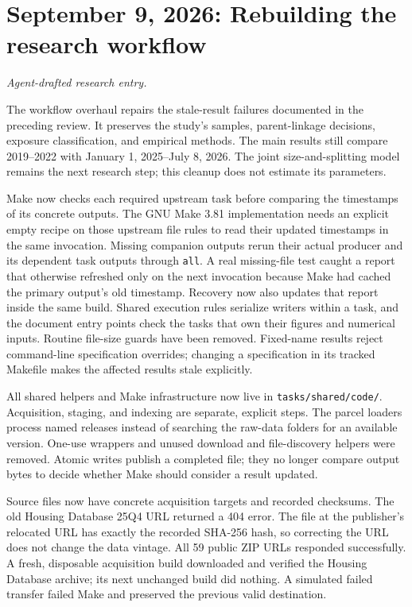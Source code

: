 \clearpage
\section*{September 9, 2026: Rebuilding the research workflow}
\textit{Agent-drafted research entry.}

The workflow overhaul repairs the stale-result failures documented in the preceding review. It preserves the study's samples, parent-linkage decisions, exposure classification, and empirical methods. The main results still compare 2019--2022 with January 1, 2025--July 8, 2026. The joint size-and-splitting model remains the next research step; this cleanup does not estimate its parameters.

Make now checks each required upstream task before comparing the timestamps of its concrete outputs. The GNU Make 3.81 implementation needs an explicit empty recipe on those upstream file rules to read their updated timestamps in the same invocation. Missing companion outputs rerun their actual producer and its dependent task outputs through \texttt{all}. A real missing-file test caught a report that otherwise refreshed only on the next invocation because Make had cached the primary output's old timestamp. Recovery now also updates that report inside the same build. Shared execution rules serialize writers within a task, and the document entry points check the tasks that own their figures and numerical inputs. Routine file-size guards have been removed. Fixed-name results reject command-line specification overrides; changing a specification in its tracked Makefile makes the affected results stale explicitly.

All shared helpers and Make infrastructure now live in \texttt{tasks/shared/code/}. Acquisition, staging, and indexing are separate, explicit steps. The parcel loaders process named releases instead of searching the raw-data folders for an available version. One-use wrappers and unused download and file-discovery helpers were removed. Atomic writes publish a completed file; they no longer compare output bytes to decide whether Make should consider a result updated.

Source files now have concrete acquisition targets and recorded checksums. The old Housing Database 25Q4 URL returned a 404 error. The file at the publisher's relocated URL has exactly the recorded SHA-256 hash, so correcting the URL does not change the data vintage. All 59 public ZIP URLs responded successfully. A fresh, disposable acquisition build downloaded and verified the Housing Database archive; its next unchanged build did nothing. A simulated failed transfer failed Make and preserved the previous valid destination.

